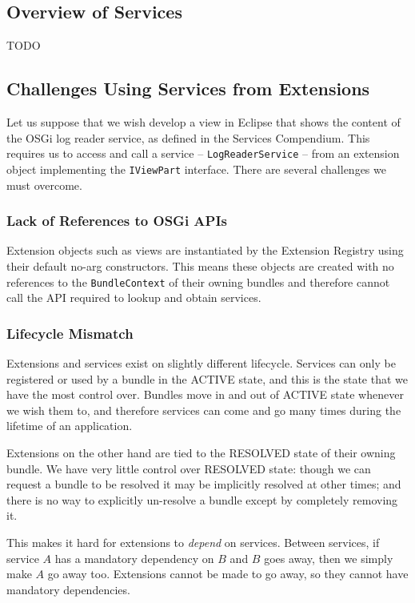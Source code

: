 \documentclass[12pt]{article}
\begin{document}
\subsection{Overview of Services}

TODO

\subsection{Challenges Using Services from Extensions}

Let us suppose that we wish develop a view in Eclipse that shows the content of the OSGi log reader service, as defined in the Services Compendium. This requires us to access and call a service -- \texttt{LogReaderService} -- from an extension object implementing the \texttt{IViewPart} interface. There are several challenges we must overcome.

\subsubsection{Lack of References to OSGi APIs}

Extension objects such as views are instantiated by the Extension Registry using their default no-arg constructors. This means these objects are created with no references to the \texttt{BundleContext} of their owning bundles and therefore cannot call the API required to lookup and obtain services.

\subsubsection{Lifecycle Mismatch}

Extensions and services exist on slightly different lifecycle. Services can only be registered or used by a bundle in the ACTIVE state, and this is the state that we have the most control over. Bundles move in and out of ACTIVE state whenever we wish them to, and therefore services can come and go many times during the lifetime of an application.

Extensions on the other hand are tied to the RESOLVED state of their owning bundle. We have very little control over RESOLVED state: though we can request a bundle to be resolved it may be implicitly resolved at other times; and there is no way to explicitly un-resolve a bundle except by completely removing it.

This makes it hard for extensions to \emph{depend} on services. Between services, if service $A$ has a mandatory dependency on $B$ and $B$ goes away, then we simply make $A$ go away too. Extensions cannot be made to go away, so they cannot have mandatory dependencies.
\end{document}

